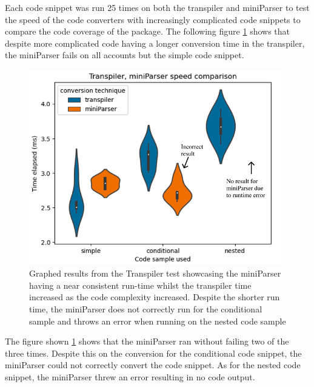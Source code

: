 \documentclass{l4proj}
\begin{document}
    

    

Each code snippet was run 25 times on both the transpiler and miniParser to test the speed of the code converters with increasingly complicated code snippets to compare the code coverage of the package. The following figure \ref{fig:transpiler-miniparser-speed-comparison} shows that despite more complicated code having a longer conversion time in the transpiler, the miniParser fails on all accounts but the simple code snippet.

\begin{figure}[H]
    \centering
    \includegraphics[width=11cm]{dissertation/images/transpiler-miniParser-speed-comparison.png}
    \caption{Graphed results from the Transpiler test showcasing the miniParser having a near consistent run-time whilst the transpiler time increased as the code complexity increased. Despite the shorter run time, the miniParser does not correctly run for the conditional sample and throws an error when running on the nested code sample }
    \label{fig:transpiler-miniparser-speed-comparison}
\end{figure}

The figure shown \ref{fig:transpiler-miniparser-speed-comparison} shows that the miniParser ran without failing two of the three times. Despite this on the conversion for the conditional code snippet, the miniParser could not correctly convert the code snippet. As for the nested code snippet, the miniParser threw an error resulting in no code output.
\end{document}
